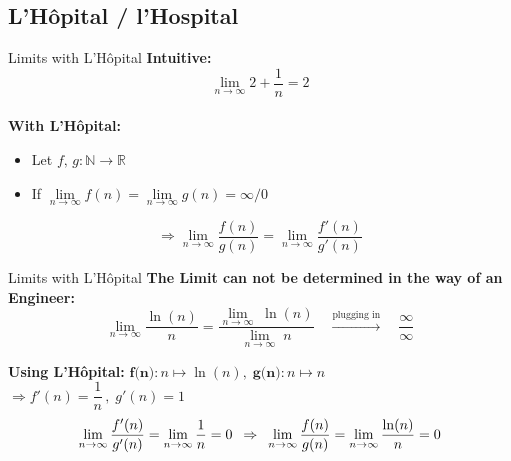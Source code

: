 \subsection{L'H\^{o}pital / l'Hospital}

\begin{frame}{Limits with L'H\^{o}pital}
  \textbf{Intuitive:}\\
  \begin{displaymath}
    \lim\limits_{n \rightarrow \infty} 2 + \dfrac{1}{n} = 2
  \end{displaymath}
  \vspace{0.0em}\\
  \textbf{With L'H\^{o}pital:}
  \begin{itemize}
    \item
      Let $f, \, g : \mathbb{N} \rightarrow \mathbb{R}$
    \item
      If
      \begin{math}
        \lim\limits_{n \to \infty} f(n)
          = \lim\limits_{n \to \infty} g(n)
          = \infty / 0
      \end{math}
  \end{itemize}
  \begin{displaymath}
    \Rightarrow \lim\limits_{n \rightarrow \infty} \dfrac{f(n)}{g(n)}
      = \lim\limits_{n \rightarrow \infty} \dfrac{f'(n)}{g'(n)}
  \end{displaymath}
\end{frame}


\begin{frame}{Limits with L'H\^{o}pital}
  \textbf{The Limit can not be determined in the way of an Engineer:}
  \begin{displaymath}
    \lim_{n \to \infty} \dfrac{\ln (n)}{n}
      = \dfrac{\lim_{n \to \infty}\; \ln (n)}{\lim\limits_{n \to \infty}\; n}
    \hspace{1em} \stackrel{\text{plugging in}}{\longrightarrow} \hspace{1em}
      \dfrac{\infty}{\infty}
  \end{displaymath}
  \begin{block}{\textbf{Using L'H\^{o}pital:}}
    $\textbf{f(n)}\!: n \mapsto \ln (n), \; \textbf{g(n)}\!: n \mapsto n$\\
    \hspace{1.5em}
    $\Rightarrow f'(n) = \dfrac{1}{n} \, , \; g'(n) = 1$
    \begin{displaymath}
      \lim\limits_{n \rightarrow \infty} \dfrac{f'(n)}{g'(n)}
        = \lim\limits_{n \rightarrow \infty} \dfrac{1}{n} = 0
      \hspace{0.5em} \Rightarrow \hspace{0.5em}
      \lim\limits_{n \rightarrow \infty} \dfrac{f(n)}{g(n)}
        = \lim\limits_{n \rightarrow \infty} \dfrac{\ln (n)}{n} = 0
    \end{displaymath}
  \end{block}
\end{frame}

